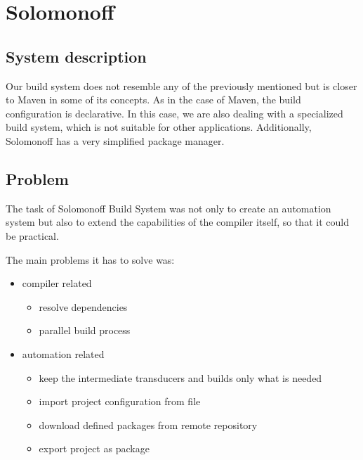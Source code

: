\hypertarget{solomonoff}{%
\section{Solomonoff}\label{solomonoff}}

\hypertarget{system-description}{%
\subsection{System description}\label{system-description}}

Our build system does not resemble any of the previously mentioned but
is closer to Maven in some of its concepts. As in the case of Maven, the
build configuration is declarative. In this case, we are also dealing
with a specialized build system, which is not suitable for other
applications. Additionally, Solomonoff has a very simplified package
manager.

\hypertarget{problem}{%
\subsection{Problem}\label{problem}}

The task of Solomonoff Build System was not only to create an automation
system but also to extend the capabilities of the compiler itself, so
that it could be practical.

The main problems it has to solve was:

\begin{itemize}
\item
  compiler related

  \begin{itemize}
  \item
    resolve dependencies
  \item
    parallel build process
  \end{itemize}
\item
  automation related

  \begin{itemize}
  \item
    keep the intermediate transducers and builds only what is needed
  \item
    import project configuration from file
  \item
    download defined packages from remote repository
  \item
    export project as package
  \end{itemize}
\end{itemize}

